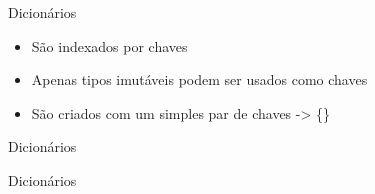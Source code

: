 \begin{frame}{Dicionários}
\begin{itemize}
	\item São indexados por chaves
	\item Apenas tipos imutáveis podem ser usados como chaves
	\item São criados com um simples par de chaves -> \{\}
\end{itemize}
\end{frame}

\begin{frame}{Dicionários}
\centering {}
\lstset{language=Python}

\end{frame}

\begin{frame}{Dicionários}
\centering {}
\lstset{language=Python}

\end{frame}